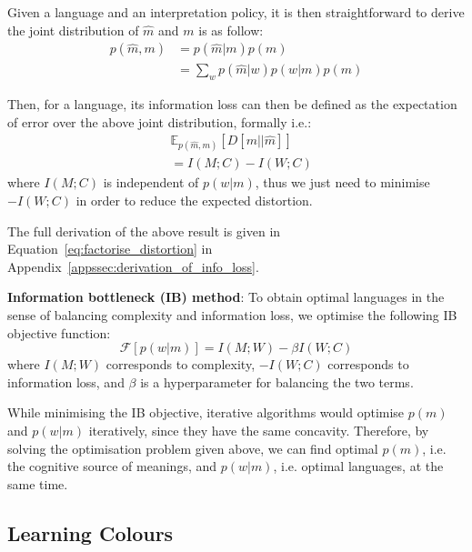 \documentclass[11pt]{article}
\begin{document}
Given a language and an interpretation policy, it is then straightforward to derive the joint distribution of $\hat{m}$ and $m$ is as follow:
\begin{equation}
    \begin{split}
        p(\hat{m},m) 
        & = p(\hat{m}|m)p(m) \\
        & = \sum_w p(\hat{m}|w)p(w|m)p(m)
    \end{split}
    \label{eq:joint_c_hat_c}
\end{equation}

Then, for a language, its information loss can then be defined as the expectation of error over the above joint distribution, formally i.e.:
\begin{equation}
    \begin{split}
        & \mathbb{E}_{p(\hat{m},m)}\left[D[m||\hat{m}]\right] \\
        & = I(M;C) - I(W;C)
    \end{split}
    \label{eq:comm_info_loss}
\end{equation}
where $I(M;C)$ is independent of $p(w|m)$, thus we just need to minimise $-I(W;C)$ in order to reduce the expected distortion.

The full derivation of the above result is given in Equation~\ref{eq:factorise_distortion} in Appendix~\ref{appssec:derivation_of_info_loss}.

\noindent\textbf{Information bottleneck (IB) method}:
To obtain optimal languages in the sense of balancing complexity and information loss, we optimise the following IB objective function:
\begin{equation}
    \mathcal{F}[p(w|m)] = I(M;W) - \beta I(W;C)
    \label{eq:comm_IB_objective}
\end{equation}
where $I(M;W)$ corresponds to complexity, $-I(W;C)$ corresponds to information loss, and $\beta$ is a hyperparameter for balancing the two terms.

While minimising the IB objective, iterative algorithms \citep[e.g.][]{arimoto1972algorithm, blahut1972computation} would optimise $p(m)$ and $p(w|m)$ iteratively, since they have the same concavity.
Therefore, by solving the optimisation problem given above, we can find optimal $p(m)$, i.e. the cognitive source of meanings, and $p(w|m)$, i.e. optimal languages, at the same time.

\subsection{Learning Colours}
\label{ssec:learning}
\end{document}
